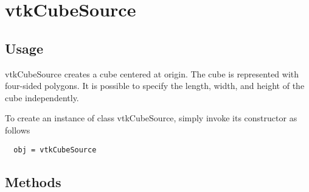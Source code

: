 \section{vtkCubeSource}

\subsection{Usage}

 vtkCubeSource creates a cube centered at origin. The cube is represented
 with four-sided polygons. It is possible to specify the length, width, 
 and height of the cube independently.

To create an instance of class vtkCubeSource, simply
invoke its constructor as follows
\begin{verbatim}
  obj = vtkCubeSource
\end{verbatim}
\subsection{Methods}

